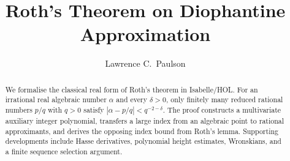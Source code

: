 \documentclass[11pt,a4paper]{article}
\begin{document}
\title{Roth's Theorem on Diophantine Approximation}
\author{Lawrence C.\ Paulson}
\maketitle

\begin{abstract}
We formalise the classical real form of Roth's theorem in Isabelle/HOL.
For an irrational real algebraic number $\alpha$ and every $\delta>0$,
only finitely many reduced rational numbers $p/q$ with $q>0$ satisfy
$|\alpha-p/q|<q^{-2-\delta}$. The proof constructs a multivariate
auxiliary integer polynomial, transfers a large index from an algebraic
point to rational approximants, and derives the opposing index bound
from Roth's lemma. Supporting developments include Hasse derivatives,
polynomial height estimates, Wronskians, and a finite sequence selection
argument.
\end{abstract}


\end{document}

